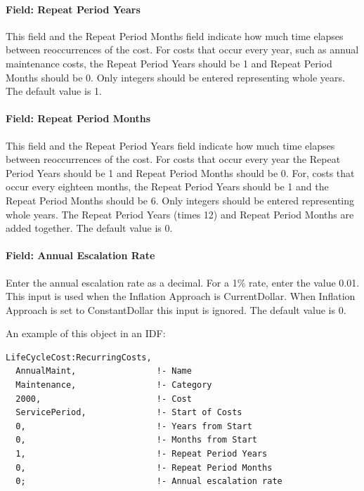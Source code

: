 \paragraph{Field: Repeat Period Years}\label{field-repeat-period-years}

This field and the Repeat Period Months field indicate how much time elapses between reoccurrences of the cost. For costs that occur every year, such as annual maintenance costs, the Repeat Period Years should be 1 and Repeat Period Months should be 0. Only integers should be entered representing whole years. The default value is 1.

\paragraph{Field: Repeat Period Months}\label{field-repeat-period-months}

This field and the Repeat Period Years field indicate how much time elapses between reoccurrences of the cost. For costs that occur every year the Repeat Period Years should be 1 and Repeat Period Months should be 0. For, costs that occur every eighteen months, the Repeat Period Years should be 1 and the Repeat Period Months should be 6. Only integers should be entered representing whole years. The Repeat Period Years (times 12) and Repeat Period Months are added together. The default value is 0.

\paragraph{Field: Annual Escalation Rate}\label{field-annual-escalation-rate}

Enter the annual escalation rate as a decimal. For a 1\% rate, enter the value 0.01. This input is used when the Inflation Approach is CurrentDollar. When Inflation Approach is set to ConstantDollar this input is ignored. The default value is 0.

An example of this object in an IDF:

\begin{lstlisting}
LifeCycleCost:RecurringCosts,
  AnnualMaint,                !- Name
  Maintenance,                !- Category
  2000,                       !- Cost
  ServicePeriod,              !- Start of Costs
  0,                          !- Years from Start
  0,                          !- Months from Start
  1,                          !- Repeat Period Years
  0,                          !- Repeat Period Months
  0;                          !- Annual escalation rate
\end{lstlisting}